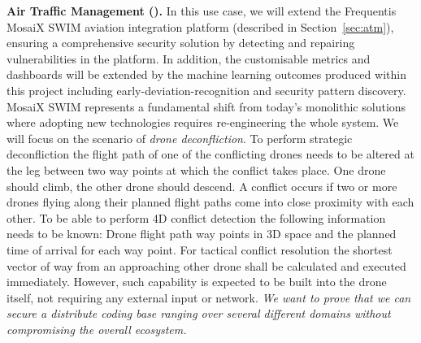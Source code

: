 \begin{Workpackage}{\thewpno}
\begin{Task}
\textbf{Air Traffic Management (\FRQshort{}).} 
In this use case, we will extend the Frequentis MosaiX SWIM aviation integration platform (described in Section~\ref{sec:atm}), ensuring a comprehensive security solution by detecting and repairing vulnerabilities in the platform. In addition, the customisable metrics and dashboards will be extended by the machine learning outcomes produced within this project including early-deviation-recognition and security pattern discovery. MosaiX SWIM represents a fundamental shift from today’s monolithic solutions where adopting new technologies requires re-engineering the whole system. We will focus on the scenario of \emph{drone deconfliction}. To perform strategic deconfliction the flight path of one of the conflicting drones needs to be altered at the leg between two way points at which the conflict takes place. One drone should climb, the other drone should descend. A conflict occurs if two or more drones flying along their planned flight paths come into close proximity with each other. To be able to perform 4D conflict detection the following information needs to be known: Drone flight path way points in 3D space and the planned time of arrival for each way point. For tactical conflict resolution the shortest vector of way from an approaching other drone shall be calculated and executed immediately. However, such capability is expected to be built into the drone itself, not requiring any external input or network. \emph{We want to prove that we can secure a distribute coding base ranging over several different domains without compromising the overall ecosystem.}



\end{Task}
\end{Workpackage}
